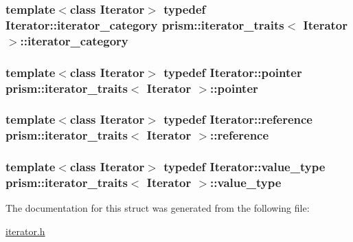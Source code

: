 \subsubsection[{\texorpdfstring{iterator\+\_\+category}{iterator_category}}]{\setlength{\rightskip}{0pt plus 5cm}template$<$class Iterator$>$ typedef Iterator\+::iterator\+\_\+category {\bf prism\+::iterator\+\_\+traits}$<$ Iterator $>$\+::{\bf iterator\+\_\+category}}\hypertarget{structprism_1_1iterator__traits_a3ae4da59bd72e7026c5fe2a23e799e1b}{}\label{structprism_1_1iterator__traits_a3ae4da59bd72e7026c5fe2a23e799e1b}
\subsubsection[{\texorpdfstring{pointer}{pointer}}]{\setlength{\rightskip}{0pt plus 5cm}template$<$class Iterator$>$ typedef Iterator\+::pointer {\bf prism\+::iterator\+\_\+traits}$<$ Iterator $>$\+::{\bf pointer}}\hypertarget{structprism_1_1iterator__traits_a74c12fd61a29bfd2a645a8d798e93810}{}\label{structprism_1_1iterator__traits_a74c12fd61a29bfd2a645a8d798e93810}
\subsubsection[{\texorpdfstring{reference}{reference}}]{\setlength{\rightskip}{0pt plus 5cm}template$<$class Iterator$>$ typedef Iterator\+::reference {\bf prism\+::iterator\+\_\+traits}$<$ Iterator $>$\+::{\bf reference}}\hypertarget{structprism_1_1iterator__traits_a18c26ae6eea81bdaeb3bd4e15038eca7}{}\label{structprism_1_1iterator__traits_a18c26ae6eea81bdaeb3bd4e15038eca7}
\subsubsection[{\texorpdfstring{value\+\_\+type}{value_type}}]{\setlength{\rightskip}{0pt plus 5cm}template$<$class Iterator$>$ typedef Iterator\+::value\+\_\+type {\bf prism\+::iterator\+\_\+traits}$<$ Iterator $>$\+::{\bf value\+\_\+type}}\hypertarget{structprism_1_1iterator__traits_a897219622ddfbb1f94aba0cc575cb30c}{}\label{structprism_1_1iterator__traits_a897219622ddfbb1f94aba0cc575cb30c}


The documentation for this struct was generated from the following file\+:\begin{DoxyCompactItemize}
\item 
\hyperlink{iterator_8h}{iterator.\+h}\end{DoxyCompactItemize}
